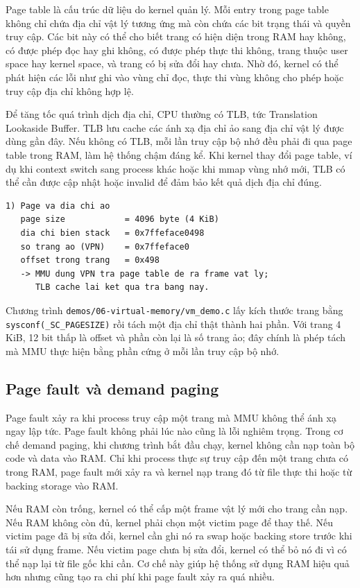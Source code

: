 \documentclass[11pt]{article}
\newcommand{\code}[1]{\texttt{#1}}
\begin{document}
Page table là cấu trúc dữ liệu do kernel quản lý. Mỗi entry trong page table không chỉ chứa địa chỉ vật lý tương ứng mà còn chứa các bit trạng thái và quyền truy cập. Các bit này có thể cho biết trang có hiện diện trong RAM hay không, có được phép đọc hay ghi không, có được phép thực thi không, trang thuộc user space hay kernel space, và trang có bị sửa đổi hay chưa. Nhờ đó, kernel có thể phát hiện các lỗi như ghi vào vùng chỉ đọc, thực thi vùng không cho phép hoặc truy cập địa chỉ không hợp lệ.

Để tăng tốc quá trình dịch địa chỉ, CPU thường có TLB, tức Translation Lookaside Buffer. TLB lưu cache các ánh xạ địa chỉ ảo sang địa chỉ vật lý được dùng gần đây. Nếu không có TLB, mỗi lần truy cập bộ nhớ đều phải đi qua page table trong RAM, làm hệ thống chậm đáng kể. Khi kernel thay đổi page table, ví dụ khi context switch sang process khác hoặc khi mmap vùng nhớ mới, TLB có thể cần được cập nhật hoặc invalid để đảm bảo kết quả dịch địa chỉ đúng.

\begin{lstlisting}[caption={Tách địa chỉ ảo thành số trang và offset}]
1) Page va dia chi ao
   page size            = 4096 byte (4 KiB)
   dia chi bien stack   = 0x7ffeface0498
   so trang ao (VPN)    = 0x7ffeface0
   offset trong trang   = 0x498
   -> MMU dung VPN tra page table de ra frame vat ly;
      TLB cache lai ket qua tra bang nay.
\end{lstlisting}

Chương trình \code{demos/06-virtual-memory/vm\_demo.c} lấy kích thước trang bằng \code{sysconf(\_SC\_PAGESIZE)} rồi tách một địa chỉ thật thành hai phần. Với trang 4 KiB, 12 bit thấp là offset và phần còn lại là số trang ảo; đây chính là phép tách mà MMU thực hiện bằng phần cứng ở mỗi lần truy cập bộ nhớ.

\subsection{Page fault và demand paging}

Page fault xảy ra khi process truy cập một trang mà MMU không thể ánh xạ ngay lập tức. Page fault không phải lúc nào cũng là lỗi nghiêm trọng. Trong cơ chế demand paging, khi chương trình bắt đầu chạy, kernel không cần nạp toàn bộ code và data vào RAM. Chỉ khi process thực sự truy cập đến một trang chưa có trong RAM, page fault mới xảy ra và kernel nạp trang đó từ file thực thi hoặc từ backing storage vào RAM.

Nếu RAM còn trống, kernel có thể cấp một frame vật lý mới cho trang cần nạp. Nếu RAM không còn đủ, kernel phải chọn một victim page để thay thế. Nếu victim page đã bị sửa đổi, kernel cần ghi nó ra swap hoặc backing store trước khi tái sử dụng frame. Nếu victim page chưa bị sửa đổi, kernel có thể bỏ nó đi vì có thể nạp lại từ file gốc khi cần. Cơ chế này giúp hệ thống sử dụng RAM hiệu quả hơn nhưng cũng tạo ra chi phí khi page fault xảy ra quá nhiều.
\end{document}
